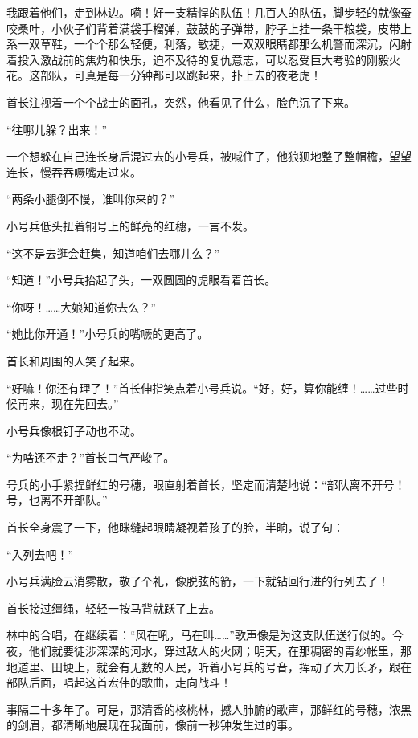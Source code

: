 \documentclass[12pt,UTF-8,openany]{ctexbook}
\begin{document}
\begin{large}
    我跟着他们，走到林边。嗬！好一支精悍的队伍！几百人的队伍，脚步轻的就像蚕咬桑叶，小伙子们背着满袋手榴弹，鼓鼓的子弹带，脖子上挂一条干粮袋，皮带上系一双草鞋，一个个那么轻便，利落，敏捷，一双双眼睛都那么机警而深沉，闪射着投入激战前的焦灼和快乐，迫不及待的复仇意志，可以忍受巨大考验的刚毅火花。这部队，可真是每一分钟都可以跳起来，扑上去的夜老虎！
    
    首长注视着一个个战士的面孔，突然，他看见了什么，脸色沉了下来。
    
    “往哪儿躲？出来！”
    
    一个想躲在自己连长身后混过去的小号兵，被喊住了，他狼狈地整了整帽檐，望望连长，慢吞吞噘嘴走过来。
    
    “两条小腿倒不慢，谁叫你来的？”
    
    小号兵低头扭着铜号上的鲜亮的红穗，一言不发。
    
    “这不是去逛会赶集，知道咱们去哪儿么？”
    
    “知道！”小号兵抬起了头，一双圆圆的虎眼看着首长。
    
    “你呀！……大娘知道你去么？”
    
    “她比你开通！”小号兵的嘴噘的更高了。
    
    首长和周围的人笑了起来。
    
    “好嘛！你还有理了！”首长伸指笑点着小号兵说。“好，好，算你能缠！……过些时候再来，现在先回去。”
    
    小号兵像根钉子动也不动。
    
    “为啥还不走？”首长口气严峻了。
    
    号兵的小手紧捏鲜红的号穗，眼直射着首长，坚定而清楚地说：“部队离不开号！号，也离不开部队。”
    
    首长全身震了一下，他眯缝起眼睛凝视着孩子的脸，半晌，说了句：
    
    “入列去吧！”
    
    小号兵满脸云消雾散，敬了个礼，像脱弦的箭，一下就钻回行进的行列去了！
    
    首长接过缰绳，轻轻一按马背就跃了上去。
    
    林中的合唱，在继续着：“风在吼，马在叫……”歌声像是为这支队伍送行似的。今夜，他们就要徒涉深深的河水，穿过敌人的火网；明天，在那稠密的青纱帐里，那地道里、田埂上，就会有无数的人民，听着小号兵的号音，挥动了大刀长矛，跟在部队后面，唱起这首宏伟的歌曲，走向战斗！
    
    事隔二十多年了。可是，那清香的核桃林，撼人肺腑的歌声，那鲜红的号穗，浓黑的剑眉，都清晰地展现在我面前，像前一秒钟发生过的事。
    

\end{large}
\end{document}
